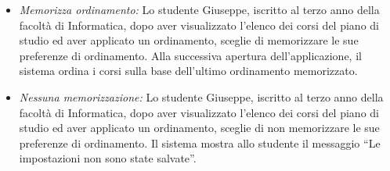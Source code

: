 \begin{itemize}
	\item \textit{Memorizza ordinamento:}
	Lo studente Giuseppe, iscritto al terzo anno della facoltà di Informatica, dopo aver visualizzato l’elenco dei corsi del piano di studio ed aver applicato un ordinamento, sceglie di memorizzare le sue preferenze di ordinamento. Alla successiva apertura dell’applicazione, il sistema ordina i corsi sulla base dell'ultimo ordinamento memorizzato.
	
	\item \textit{Nessuna memorizzazione:}
	Lo studente Giuseppe, iscritto al terzo anno della facoltà di Informatica, dopo aver visualizzato l’elenco dei corsi del piano di studio ed aver applicato un ordinamento, sceglie di non memorizzare le sue preferenze di ordinamento. Il sistema mostra allo studente il messaggio “Le impostazioni non sono state salvate”. 
\end{itemize}

